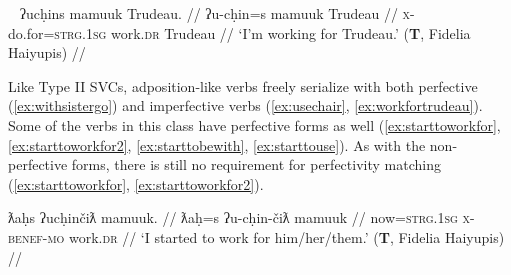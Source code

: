 \ex~ \label{ex:workfortrudeau}
\begingl
\glpreamble ʔucḥins mamuuk Trudeau. //
\gla ʔu-cḥin=s mamuuk Trudeau //
\glb \textsc{x}-do.for=\textsc{strg.1sg} work.\textsc{dr} Trudeau //
\glft `I'm working for Trudeau.' (\textbf{T}, Fidelia Haiyupis) //
\endgl
\xe

\begin{comment}
\ex \label{ex:goingwithfriend}
\begingl
\glpreamble ʔucačiʔaƛukʷitaḥ t̓an̓eʔis c̓uumaʕas ʔukʷink yaaqsčaʕinʔitq. //
\gla ʔu-ca-čiƛ=!aƛ=uk=(m)it=(m)aˑḥ t̓an̓a=ʔis c̓uumaʕas ʔu-(č)ink yaq-L.(k)sčaʕin=ʔiˑtq //
\glb \textsc{x}-go-\textsc{mo}=\textsc{now}=\textsc{poss}=\textsc{pst}=\textsc{real.1sg} child=\textsc{dim} Port.Alberni \textsc{x}-with who-friendly=\textsc{defn.3} //
\glft `My child went to Port Alberni with his friend.' (\textbf{B}, Bob Mundy) //
\endgl
\xe

\ex~ \label{ex:*goingwithfriend}
\begingl
\glpreamble *ʔukʷink̓aƛukʷitaḥ ʔucačiƛ t̓an̓eʔis yaaqsčaʕinʔitq. //
\gla ʔu-(č)ink=!aƛ=uk=(m)it=(m)aˑḥ ʔu-ca-čiƛ t̓an̓a=ʔis yaq-L.(k)sčaʕin=ʔiˑtq //
\glb \textsc{x}-with=\textsc{now}=\textsc{poss}=\textsc{pst}=\textsc{real.1sg} \textsc{x}-go-\textsc{mo} child=\textsc{dim} who-friendly=\textsc{defn.3} //
\glft Intended: `My child went with his friend.' (\textbf{B}, Bob Mundy) //
\endgl
\xe
\end{comment}



Like Type II SVCs, adposition-like verbs freely serialize with both perfective (\ref{ex:withsistergo}) and imperfective verbs (\ref{ex:usechair}, \ref{ex:workfortrudeau}). Some of the verbs in this class have perfective forms as well (\ref{ex:starttoworkfor}, \ref{ex:starttoworkfor2}, \ref{ex:starttobewith}, \ref{ex:starttouse}). As with the non-perfective forms, there is still no requirement for perfectivity matching (\ref{ex:starttoworkfor}, \ref{ex:starttoworkfor2}).

\ex \label{ex:starttoworkfor}
\begingl
\glpreamble ƛaḥs ʔucḥinčiƛ mamuuk. //
\gla ƛaḥ=s ʔu-cḥin-čiƛ mamuuk //
\glb now=\textsc{strg.1sg} \textsc{x}-\textsc{benef}-\textsc{mo} work.\textsc{dr} //
\glft `I started to work for him/her/them.' (\textbf{T}, Fidelia Haiyupis) //
\endgl
\xe

